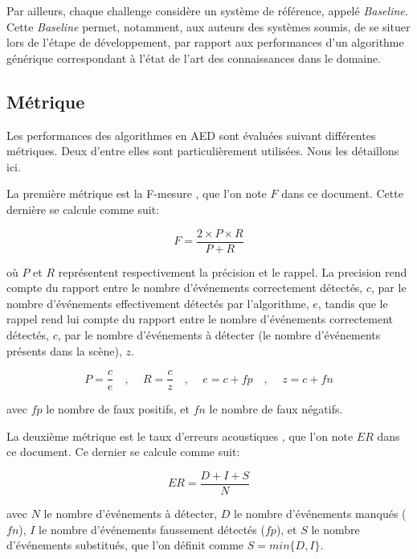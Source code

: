 Par ailleurs, chaque challenge considère un système de référence, appelé \emph{Baseline}. Cette \emph{Baseline} permet, notamment, aux auteurs des systèmes soumis, de se situer lors de l'étape de développement, par rapport aux performances d'un algorithme générique correspondant à l'état de l'art des connaissances dans le domaine.

\subsection{Métrique}
\label{sec:ch6_metriqueAED}

Les performances des algorithmes en AED sont évaluées suivant différentes métriques. Deux d'entre elles sont particulièrement utilisées. Nous les détaillons ici.

La première métrique est la F-mesure \citep{Giannoulis2013database,giannoulis2013detection,Stowell15}, que l'on note $F$ dans ce document. Cette dernière se calcule comme suit:

\begin{equation}
F=\dfrac{2\times P \times R}{P+R}
\end{equation}

où $P$ et $R$ représentent respectivement la précision et le rappel. La precision rend compte du rapport entre le nombre d'événements correctement détectés, $c$, par le nombre d'événements effectivement détectés par l'algorithme, $e$, tandis que le rappel rend lui compte du rapport entre le nombre d'événements correctement détectés, $c$, par le nombre d'événements à détecter (le nombre d'événements présents dans la scène), $z$.

\begin{equation}
P=\dfrac{c}{e}  \quad \textrm{, } \quad R=\dfrac{c}{z} \quad \textrm{, } \quad  e=c+fp \quad \textrm{, } \quad  z=c+fn
\end{equation}

avec $fp$ le nombre de faux positifs, et $fn$ le nombre de faux négatifs.

La deuxième métrique est le taux d'erreurs acoustiques \citep{poliner2007discriminative,clear}, que l'on note $ER$ dans ce document. Ce dernier se calcule comme suit:

\begin{equation}
ER=\dfrac{D+I+S}{N}
\end{equation}

avec $N$ le nombre d'événements à détecter, $D$ le nombre d'événements manqués ($fn$), $I$ le nombre d'événements faussement détectés ($fp$), et $S$ le nombre d'événements substitués, que l'on définit comme $S=min\lbrace D,I\rbrace$.

